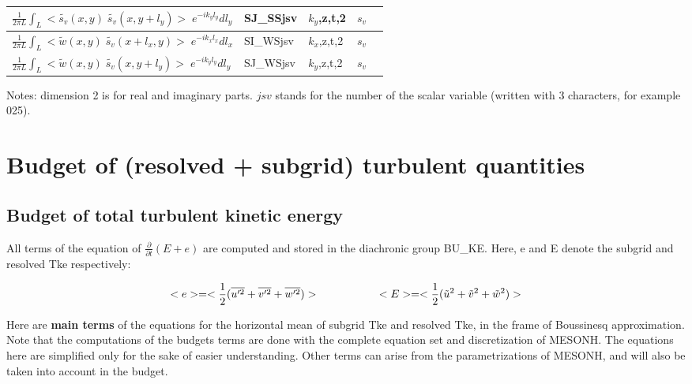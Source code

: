 \begin{longtable}[c]{|p{}|p{}|p{}|p{}|p{}|}
$\frac{1}{2\pi L}\int_L<\tilde{s_v}(x,y)\;\tilde{s_v}(x,y+l_y)>\;e^{-ik_yl_y}dl_y$           & SJ\_SSjsv & $k_y$,z,t,2 & $s_v$ & \\\hline
$\frac{1}{2\pi L}\int_L<\tilde{w}(x,y)\;\tilde{s_v}(x+l_x,y)>\;e^{-ik_xl_x}dl_x$             & SI\_WSjsv & $k_x$,z,t,2 & $s_v$ & \\\hline
$\frac{1}{2\pi L}\int_L<\tilde{w}(x,y)\;\tilde{s_v}(x,y+l_y)>\;e^{-ik_yl_y}dl_y$             & SJ\_WSjsv & $k_y$,z,t,2 & $s_v$ & \\\hline
\end{longtable}

Notes: dimension 2 is for real and imaginary parts. $jsv$ stands for the number of the scalar variable (written with 3 characters, for example 025).


\section{Budget of (resolved + subgrid) turbulent quantities}

\subsection{Budget of total turbulent kinetic energy}


All terms of the equation of $\frac{\partial}{\partial t} (E+e)$ are
computed and stored in the diachronic group BU\_KE. Here, e and E
denote the subgrid and resolved Tke respectively:

\begin{displaymath}
<e>=<\frac{1}{2}(\overline{u'^2}+\overline{v'^2}+\overline{w'^2})> \hspace*{2.cm}
<E>=<\frac{1}{2}(\tilde{u}^2+\tilde{v}^2+\tilde{w}^2)>
\end{displaymath}


Here are {\bf main terms} of the equations for the horizontal mean
of subgrid Tke and resolved Tke, in the
frame of Boussinesq approximation. Note that the computations of the budgets terms are done with the complete equation set and discretization of MESONH.
The equations here are simplified only for the sake of easier
understanding.
Other terms can arise
from the parametrizations of MESONH, and will also be taken into account
in the budget.

